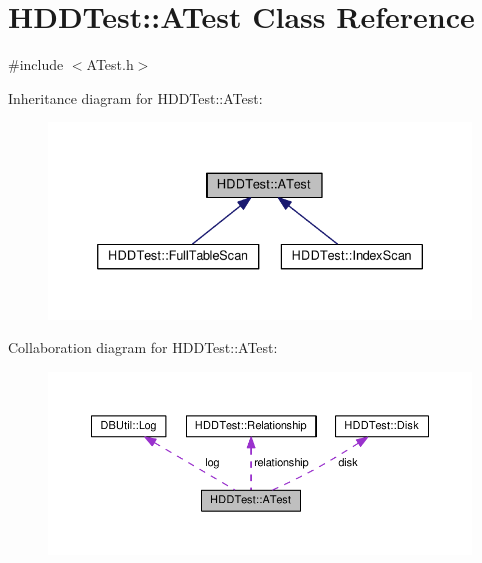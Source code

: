 \hypertarget{class_h_d_d_test_1_1_a_test}{\section{H\-D\-D\-Test\-:\-:A\-Test Class Reference}
\label{class_h_d_d_test_1_1_a_test}
}


{\ttfamily \#include $<$A\-Test.\-h$>$}



Inheritance diagram for H\-D\-D\-Test\-:\-:A\-Test\-:\nopagebreak
\begin{figure}[H]
\begin{center}
\leavevmode
\includegraphics[width=335pt]{class_h_d_d_test_1_1_a_test__inherit__graph}
\end{center}
\end{figure}


Collaboration diagram for H\-D\-D\-Test\-:\-:A\-Test\-:\nopagebreak
\begin{figure}[H]
\begin{center}
\leavevmode
\includegraphics[width=350pt]{class_h_d_d_test_1_1_a_test__coll__graph}
\end{center}
\end{figure}
